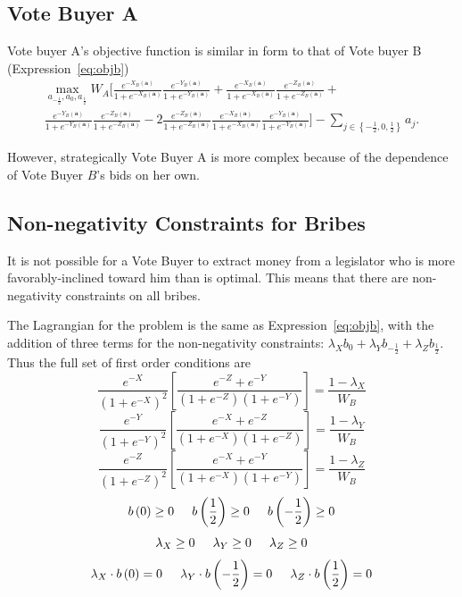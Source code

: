 \documentclass[12pt]{article}
\begin{document}
\subsection{Vote Buyer A}
Vote buyer A's objective function is similar in form to that of Vote buyer B (Expression~\ref{eq:objb}) 
			  \begin{multline}
			    \max_{a_{-\frac{1}{2}}, a_0, a_{\frac{1}{2}}} 
					W_A \biggl[ \frac{e^{-X_B(\bm{a})}}{1+e^{-X_B(\bm{a})}} \frac{e^{-Y_B(\bm{a})}}{1+e^{-Y_B(\bm{a})}} +
					\frac{e^{-X_B(\bm{a})}}{1+e^{-X_B(\bm{a})}} \frac{e^{-Z_B(\bm{a})}}{1+e^{-Z_B(\bm{a})}} + \\
					\frac{e^{-Y_B(\bm{a})}}{1+e^{-Y_B(\bm{a})}} \frac{e^{-Z_B(\bm{a})}}{1+e^{-Z_B(\bm{a})}} - 2	\frac{e^{-Z_B(\bm{a})}}{1+e^{-Z_B(\bm{a})}} \frac{e^{-X_B(\bm{a})}}{1+e^{-X_B(\bm{a})}} \frac{e^{-Y_B(\bm{a})}}{1+e^{-Y_B(\bm{a})}} \biggr] - \sum_{j\in \left\{-\frac{1}{2}, 0,\frac{1}{2}\right\}} a_j .
					\label{eq:obja}
				\end{multline}



However, strategically Vote Buyer A is more complex because of the dependence of Vote Buyer $B$'s bids on her own.
				
\subsection{Non-negativity Constraints for Bribes}
\label{sec:nonneg}
It is not possible for a Vote Buyer to extract money from a legislator who is more favorably-inclined toward him than is optimal. This means that there are non-negativity constraints on all bribes. 

The Lagrangian for the problem is the same as Expression~\ref{eq:objb}, with the addition of three terms for the non-negativity constraints: $\lambda_X b_0 + \lambda_Y b_{-\frac{1}{2}} + \lambda_Z b_{\frac{1}{2}}$. Thus the full set of first order conditions are
\begin{equation}
    \frac{e^{-X}}{\left(1+e^{-X}\right)^2}\left[\frac{e^{-Z} + e^{-Y}}{\left(1+e^{-Z}\right)\left(1+e^{-Y}\right)} \right] = \frac{1 - \lambda_X}{W_B}
		\label{eq:focB}
\end{equation}
\begin{equation}
    \frac{e^{-Y}}{\left(1+e^{-Y}\right)^2}\left[\frac{e^{-X} + e^{-Z}}{\left(1+e^{-X}\right)\left(1+e^{-Z}\right)} \right] = \frac{1 - \lambda_Y}{W_B}
\end{equation}
\begin{equation}
    \frac{e^{-Z}}{\left(1+e^{-Z}\right)^2}\left[\frac{e^{-X} + e^{-Y}}{\left(1+e^{-X}\right)\left(1+e^{-Y}\right)} \right] = \frac{1 - \lambda_Z}{W_B}
\end{equation}
\[
  b\left(0\right) \geq0 \hskip.2in b\left(\frac{1}{2}\right) \geq0 \hskip.2in b\left(-\frac{1}{2}\right) \geq0 
\]
\[
  \lambda_X \geq0 \hskip.2in \lambda_Y \geq0 \hskip.2in \lambda_Z \geq0 
\]
\[
  \lambda_X \cdot b\left(0\right) = 0 \hskip.2in \lambda_Y \cdot b\left(-\frac{1}{2}\right) = 0 \hskip.2in \lambda_Z \cdot b\left(\frac{1}{2}\right) = 0 
\]
\end{document}
